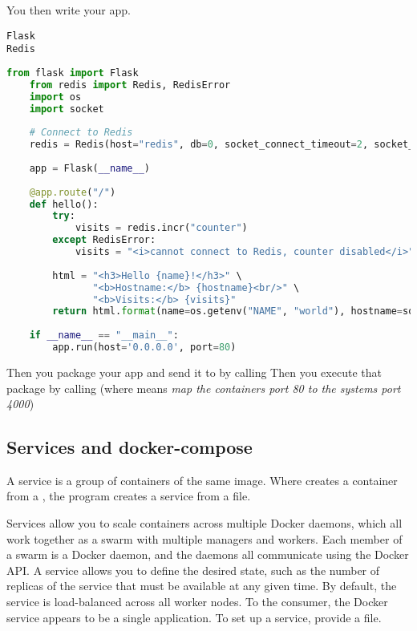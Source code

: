 You then write your app. 
\begin{lstlisting}[caption=requirements.txt]
Flask
Redis
\end{lstlisting}

\begin{lstlisting}[language=python, caption=main.py]
    from flask import Flask
    from redis import Redis, RedisError
    import os
    import socket
    
    # Connect to Redis
    redis = Redis(host="redis", db=0, socket_connect_timeout=2, socket_timeout=2)
    
    app = Flask(__name__)
    
    @app.route("/")
    def hello():
        try:
            visits = redis.incr("counter")
        except RedisError:
            visits = "<i>cannot connect to Redis, counter disabled</i>"
    
        html = "<h3>Hello {name}!</h3>" \
               "<b>Hostname:</b> {hostname}<br/>" \
               "<b>Visits:</b> {visits}"
        return html.format(name=os.getenv("NAME", "world"), hostname=socket.gethostname(), visits=visits)
    
    if __name__ == "__main__":
        app.run(host='0.0.0.0', port=80)
\end{lstlisting}
Then you package your app and send it to  by calling 
Then you execute that package by calling  (where  means \emph{map the containers port 80 to the systems port 4000})


\subsection{Services and docker-compose}

A service is a group of containers of the same image. Where  creates a container from a , the program  creates a service from a  file. 

Services allow you to scale containers across multiple Docker daemons, which all work together as a swarm with multiple managers and workers. Each member of a swarm is a Docker daemon, and the daemons all communicate using the Docker API. A service allows you to define the desired state, such as the number of replicas of the service that must be available at any given time. By default, the service is load-balanced across all worker nodes. To the consumer, the Docker service appears to be a single application. 
To set up a service, provide a  file.

